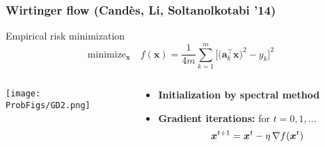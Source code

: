 \documentclass[compress,
mathserif,wide,%
]{beamer}
\newcommand{\ProbFigs}{figure}
\begin{document}
\begin{frame}
\frametitle{Wirtinger flow (Cand\`es, Li, Soltanolkotabi '14)}


Empirical risk minimization
\[
\text{minimize}_{\bm{x}}\quad f(\bm{x})=\frac{1}{4m}\sum_{k=1}^{m}\Big[ \big(\bm{a}_{k}^{\top}\bm{x}\big)^{2}-y_{k} \Big]^{2}
\]


\pause

\vspace{-2em}


\begin{columns}
\begin{column}{0.3\textwidth}

\begin{center}
  \texttt{[image: \\ProbFigs/GD2.png]}
\end{center}

\end{column}



\begin{column}{0.7\textwidth}

\begin{itemize}
\item {\bf Initialization by spectral method}

\bigskip
\bigskip

\item {\bf Gradient iterations:} for $t = 0, 1, \ldots$ 
  \[
  \bm{x}^{t+1}= \bm{x}^t- \eta \, \nabla f(\bm{x}^t)
\]
\end{itemize}

\end{column}
\end{columns}

\end{frame}

%
\end{document}
